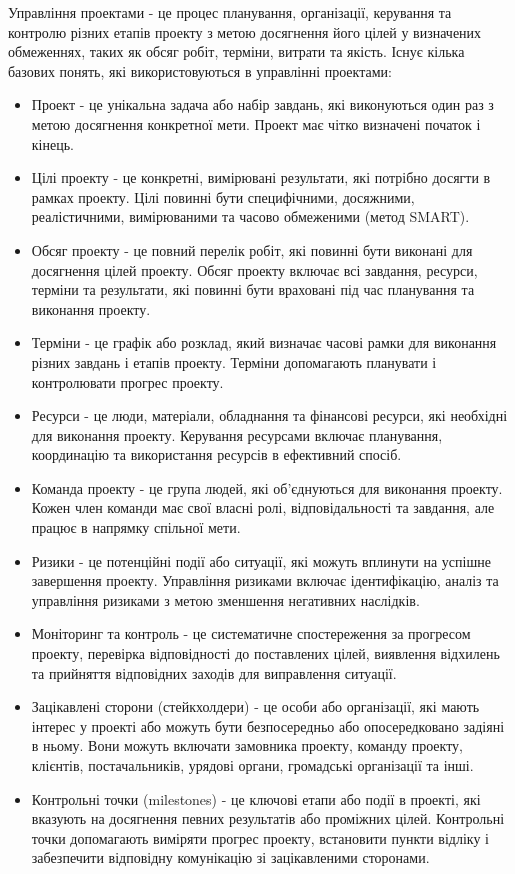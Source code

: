 \documentclass[oneside,14pt]{extarticle}
\begin{document}
Управління проектами - це процес планування, організації, керування та контролю різних етапів проекту з метою досягнення його цілей у визначених обмеженнях, таких як обсяг робіт, терміни, витрати та якість. Існує кілька базових понять, які використовуються в управлінні проектами:
\begin{itemize}
	\item Проект - це унікальна задача або набір завдань, які виконуються один раз з метою досягнення конкретної мети. Проект має чітко визначені початок і кінець.
	\item Цілі проекту - це конкретні, вимірювані результати, які потрібно досягти в рамках проекту. Цілі повинні бути специфічними, досяжними, реалістичними, вимірюваними та часово обмеженими (метод SMART).
	\item Обсяг проекту - це повний перелік робіт, які повинні бути виконані для досягнення цілей проекту. Обсяг проекту включає всі завдання, ресурси, терміни та результати, які повинні бути враховані під час планування та виконання проекту.
	\item Терміни - це графік або розклад, який визначає часові рамки для виконання різних завдань і етапів проекту. Терміни допомагають планувати і контролювати прогрес проекту.
	\item Ресурси - це люди, матеріали, обладнання та фінансові ресурси, які необхідні для виконання проекту. Керування ресурсами включає планування, координацію та використання ресурсів в ефективний спосіб.
	\item Команда проекту - це група людей, які об'єднуються для виконання проекту. Кожен член команди має свої власні ролі, відповідальності та завдання, але працює в напрямку спільної мети.
	\item Ризики - це потенційні події або ситуації, які можуть вплинути на успішне завершення проекту. Управління ризиками включає ідентифікацію, аналіз та управління ризиками з метою зменшення негативних наслідків.
	\item Моніторинг та контроль - це систематичне спостереження за прогресом проекту, перевірка відповідності до поставлених цілей, виявлення відхилень та прийняття відповідних заходів для виправлення ситуації.
	\item Зацікавлені сторони (стейкхолдери) - це особи або організації, які мають інтерес у проекті або можуть бути безпосередньо або опосередковано задіяні в ньому. Вони можуть включати замовника проекту, команду проекту, клієнтів, постачальників, урядові органи, громадські організації та інші.
	\item Контрольні точки (milestones) - це ключові етапи або події в проекті, які вказують на досягнення певних результатів або проміжних цілей. Контрольні точки допомагають виміряти прогрес проекту, встановити пункти відліку і забезпечити відповідну комунікацію зі зацікавленими сторонами.

\end{itemize}
\end{document}
